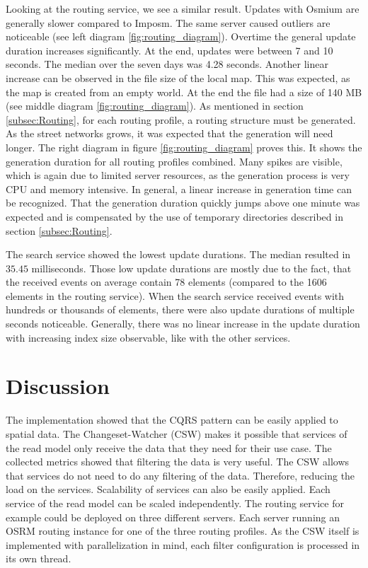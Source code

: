 \documentclass[conference]{IEEEtran}
\begin{document}
Looking at the routing service, we see a similar result. Updates with Osmium are generally slower compared to Imposm. The same server caused outliers are noticeable (see left diagram \ref{fig:routing_diagram}). Overtime the general update duration increases significantly. At the end, updates were between 7 and 10 seconds. The median over the seven days was 4.28 seconds. Another linear increase can be observed in the file size of the local map. This was expected, as the map is created from an empty world. At the end the file had a size of 140 MB (see middle diagram \ref{fig:routing_diagram}). As mentioned in section \ref{subsec:Routing}, for each routing profile, a routing structure must be generated. As the street networks grows, it was expected that the generation will need longer. The right diagram in figure \ref{fig:routing_diagram} proves this. It shows the generation duration for all routing profiles combined. Many spikes are visible, which is again due to limited server resources, as the generation process is very CPU and memory intensive. In general, a linear increase in generation time can be recognized. That the generation duration quickly jumps above one minute was expected and is compensated by the use of temporary directories described in section \ref{subsec:Routing}.

The search service showed the lowest update durations. The median resulted in $35.45$ milliseconds. Those low update durations are mostly due to the fact, that the received events on average contain 78 elements (compared to the 1606 elements in the routing service). When the search service received events with hundreds or thousands of elements, there were also update durations of multiple seconds noticeable. Generally, there was no linear increase in the update duration with increasing index size observable, like with the other services. 

\section{Discussion}
\label{sec:Discussion}
The implementation showed that the CQRS pattern can be easily applied to spatial data. The Changeset-Watcher (CSW) makes it possible that services of the read model only receive the data that they need for their use case. The collected metrics showed that filtering the data is very useful. The CSW allows that services do not need to do any filtering of the data. Therefore, reducing the load on the services.
Scalability of services can also be easily applied. Each service of the read model can be scaled independently. The routing service for example could be deployed on three different servers. Each server running an OSRM routing instance for one of the three routing profiles. As the CSW itself is implemented with parallelization in mind, each filter configuration is processed in its own thread.   
\end{document}
